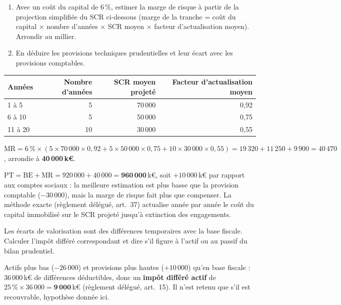 \documentclass[11pt,a4paper]{article}
\newcommand{\keur}{\,k\euro}
\begin{document}
\begin{exercice}
\begin{enumerate}[nosep]
  \item Avec un coût du capital de 6\,\%, estimer la marge de risque à partir de la projection
        simplifiée du SCR ci-dessous (marge de la tranche = coût du capital $\times$ nombre
        d'années $\times$ SCR moyen $\times$ facteur d'actualisation moyen). Arrondir au millier.
  \item En déduire les provisions techniques prudentielles et leur écart avec les provisions comptables.
\end{enumerate}
\begin{center}
\small
\begin{tabular}{lrrr}
\toprule
Années & Nombre d'années & SCR moyen projeté & Facteur d'actualisation moyen \\
\midrule
1 à 5   & 5  & 70\,000 & 0,92 \\
6 à 10  & 5  & 50\,000 & 0,75 \\
11 à 20 & 10 & 30\,000 & 0,55 \\
\bottomrule
\end{tabular}
\end{center}
\end{exercice}
\begin{corrige}
$\mathrm{MR} = 6\,\% \times (5 \times 70\,000 \times 0{,}92 + 5 \times 50\,000 \times 0{,}75
 + 10 \times 30\,000 \times 0{,}55) = 19\,320 + 11\,250 + 9\,900 = 40\,470$, arrondie à
\textbf{40\,000\keur}.

\noindent $\mathrm{PT} = \mathrm{BE} + \mathrm{MR} = 920\,000 + 40\,000 = \mathbf{960\,000}$\keur,
soit $+10\,000$\keur{} par rapport aux comptes sociaux : la meilleure estimation est plus basse que
la provision comptable ($-30\,000$), mais la marge de risque fait plus que compenser.
La méthode exacte (règlement délégué, art.~37) actualise année par année le coût du capital
immobilisé sur le SCR projeté jusqu'à extinction des engagements.
\end{corrige}

\begin{exercice}
Les écarts de valorisation sont des différences temporaires avec la base fiscale. Calculer
l'impôt différé correspondant et dire s'il figure à l'actif ou au passif du bilan prudentiel.
\end{exercice}
\begin{corrige}
Actifs plus bas ($-26\,000$) et provisions plus hautes ($+10\,000$) qu'en base fiscale : 36\,000\keur
de différences déductibles, donc un \textbf{impôt différé actif} de
$25\,\% \times 36\,000 = \mathbf{9\,000}$\keur{} (règlement délégué, art.~15). Il n'est retenu que
s'il est recouvrable, hypothèse donnée ici.
\end{corrige}
\end{document}
